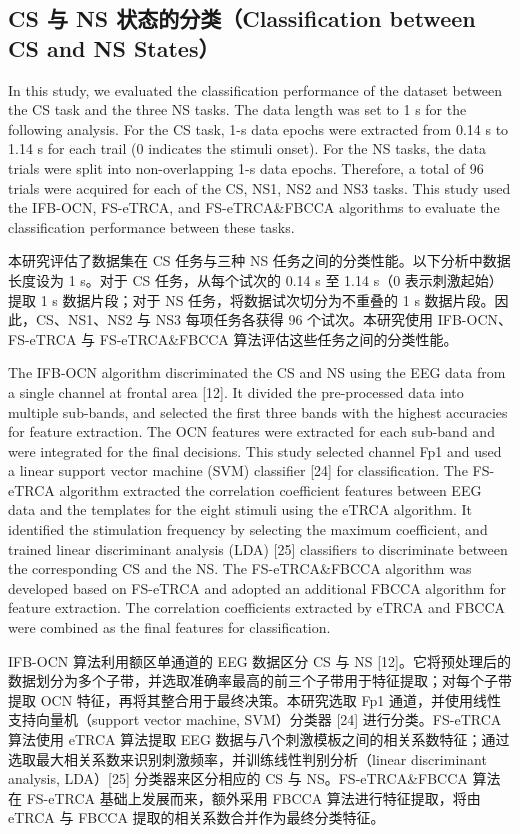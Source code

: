 \documentclass[11pt]{ctexart}
\newenvironment{en}{\begin{enbox}\color{black!85}}{\end{enbox}}
\newenvironment{zh}{\begin{zhbox}}{\end{zhbox}}
\begin{document}
\subsection{CS 与 NS 状态的分类（Classification between CS and NS States）}
\begin{en}
In this study, we evaluated the classification performance of the dataset between the CS task and the three NS tasks. The data length was set to 1 s for the following analysis. For the CS task, 1-s data epochs were extracted from 0.14 s to 1.14 s for each trail (0 indicates the stimuli onset). For the NS tasks, the data trials were split into non-overlapping 1-s data epochs. Therefore, a total of 96 trials were acquired for each of the CS, NS1, NS2 and NS3 tasks. This study used the IFB-OCN, FS-eTRCA, and FS-eTRCA\&FBCCA algorithms to evaluate the classification performance between these tasks.
\end{en}
\begin{zh}
本研究评估了数据集在 CS 任务与三种 NS 任务之间的分类性能。以下分析中数据长度设为 1 s。对于 CS 任务，从每个试次的 0.14 s 至 1.14 s（0 表示刺激起始）提取 1 s 数据片段；对于 NS 任务，将数据试次切分为不重叠的 1 s 数据片段。因此，CS、NS1、NS2 与 NS3 每项任务各获得 96 个试次。本研究使用 IFB-OCN、FS-eTRCA 与 FS-eTRCA\&FBCCA 算法评估这些任务之间的分类性能。
\end{zh}

\begin{en}
The IFB-OCN algorithm discriminated the CS and NS using the EEG data from a single channel at frontal area [12]. It divided the pre-processed data into multiple sub-bands, and selected the first three bands with the highest accuracies for feature extraction. The OCN features were extracted for each sub-band and were integrated for the final decisions. This study selected channel Fp1 and used a linear support vector machine (SVM) classifier [24] for classification. The FS-eTRCA algorithm extracted the correlation coefficient features between EEG data and the templates for the eight stimuli using the eTRCA algorithm. It identified the stimulation frequency by selecting the maximum coefficient, and trained linear discriminant analysis (LDA) [25] classifiers to discriminate between the corresponding CS and the NS. The FS-eTRCA\&FBCCA algorithm was developed based on FS-eTRCA and adopted an additional FBCCA algorithm for feature extraction. The correlation coefficients extracted by eTRCA and FBCCA were combined as the final features for classification.
\end{en}
\begin{zh}
IFB-OCN 算法利用额区单通道的 EEG 数据区分 CS 与 NS [12]。它将预处理后的数据划分为多个子带，并选取准确率最高的前三个子带用于特征提取；对每个子带提取 OCN 特征，再将其整合用于最终决策。本研究选取 Fp1 通道，并使用线性支持向量机（support vector machine, SVM）分类器 [24] 进行分类。FS-eTRCA 算法使用 eTRCA 算法提取 EEG 数据与八个刺激模板之间的相关系数特征；通过选取最大相关系数来识别刺激频率，并训练线性判别分析（linear discriminant analysis, LDA）[25] 分类器来区分相应的 CS 与 NS。FS-eTRCA\&FBCCA 算法在 FS-eTRCA 基础上发展而来，额外采用 FBCCA 算法进行特征提取，将由 eTRCA 与 FBCCA 提取的相关系数合并作为最终分类特征。
\end{zh}
\end{document}
